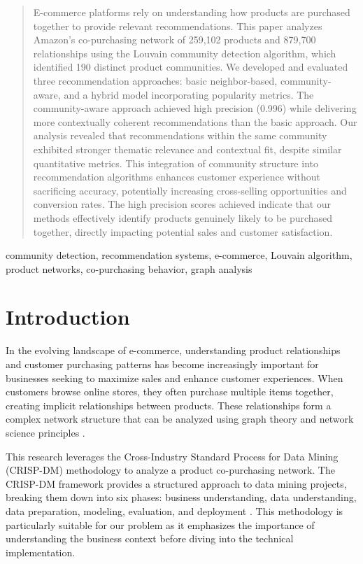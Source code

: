 \documentclass[conference]{IEEEtran}
\begin{document}
\begin{abstract}
E-commerce platforms rely on understanding how products are purchased together to provide relevant recommendations. This paper analyzes Amazon's co-purchasing network of 259,102 products and 879,700 relationships using the Louvain community detection algorithm, which identified 190 distinct product communities. We developed and evaluated three recommendation approaches: basic neighbor-based, community-aware, and a hybrid model incorporating popularity metrics. The community-aware approach achieved high precision (0.996) while delivering more contextually coherent recommendations than the basic approach. Our analysis revealed that recommendations within the same community exhibited stronger thematic relevance and contextual fit, despite similar quantitative metrics. This integration of community structure into recommendation algorithms enhances customer experience without sacrificing accuracy, potentially increasing cross-selling opportunities and conversion rates. The high precision scores achieved indicate that our methods effectively identify products genuinely likely to be purchased together, directly impacting potential sales and customer satisfaction.
\end{abstract}

\begin{IEEEkeywords}
community detection, recommendation systems, e-commerce, Louvain algorithm, product networks, co-purchasing behavior, graph analysis
\end{IEEEkeywords}

\section{Introduction}
In the evolving landscape of e-commerce, understanding product relationships and customer purchasing patterns has become increasingly important for businesses seeking to maximize sales and enhance customer experiences. When customers browse online stores, they often purchase multiple items together, creating implicit relationships between products. These relationships form a complex network structure that can be analyzed using graph theory and network science principles \cite{linden2003amazon}.

This research leverages the Cross-Industry Standard Process for Data Mining (CRISP-DM) methodology to analyze a product co-purchasing network. The CRISP-DM framework provides a structured approach to data mining projects, breaking them down into six phases: business understanding, data understanding, data preparation, modeling, evaluation, and deployment \cite{shearer2000crisp}. This methodology is particularly suitable for our problem as it emphasizes the importance of understanding the business context before diving into the technical implementation.
\end{document}
